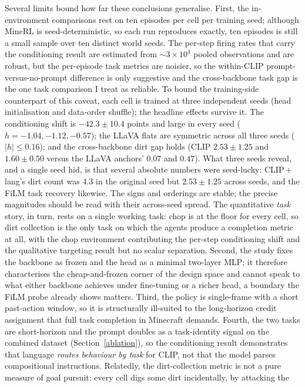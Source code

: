 Several limits bound how far these conclusions generalise. First, the
in-environment comparisons rest on ten episodes per cell per training seed;
although MineRL is seed-deterministic, so each run reproduces exactly, ten
episodes is still a small sample over ten distinct world seeds. The per-step
firing rates that carry the conditioning result are estimated from
$\sim\!3\times10^4$ pooled observations and are robust, but the per-episode task
metrics are noisier, so the within-CLIP prompt-versus-no-prompt difference is only
suggestive and the cross-backbone task gap is the one task comparison I treat as
reliable. To bound the training-side counterpart of this caveat, each cell is
trained at three independent seeds (head initialisation and data-order shuffle);
the headline effects survive it. The conditioning shift is $-42.3\pm10.4$ points
and large in every seed ($h=-1.04,-1.12,-0.57$); the LLaVA flats are symmetric
across all three seeds ($|h|\le0.16$); and the cross-backbone dirt gap holds (CLIP
$2.53\pm1.25$ and $1.60\pm0.50$ versus the LLaVA anchors' $0.07$ and $0.47$). What
three seeds reveal, and a single seed hid, is that several absolute numbers were
seed-lucky: CLIP\,+\,lang's dirt count was $4.3$ in the original seed but
$2.53\pm1.25$ across seeds, and the FiLM task recovery likewise. The signs and
orderings are stable; the precise magnitudes should be read with their across-seed
spread. The quantitative \emph{task} story, in turn, rests on a single working
task: chop is at the floor for every cell, so dirt collection is the only task on
which the agents produce a completion metric at all, with the chop environment
contributing the per-step conditioning shift and the qualitative targeting result
but no scalar separation. Second, the study fixes the
backbone as frozen and the head as a minimal two-layer MLP; it therefore
characterises the cheap-and-frozen corner of the design space and cannot speak to
what either backbone achieves under fine-tuning or a richer head, a boundary the
FiLM probe already shows matters. Third, the policy is single-frame with a short
past-action window, so it is structurally ill-suited to the long-horizon credit
assignment that full task completion in Minecraft demands. Fourth, the two tasks
are short-horizon and the prompt doubles as a task-identity signal on the combined
dataset (Section~\ref{ablation}), so the conditioning result demonstrates that
language \emph{routes behaviour by task} for CLIP, not that the model parses
compositional instructions. Relatedly, the dirt-collection metric is not a pure
measure of goal pursuit: every cell digs some dirt incidentally, by attacking the
